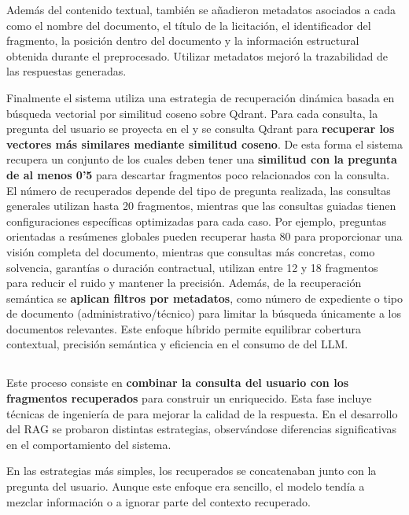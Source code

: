 Además del contenido textual, también se añadieron metadatos asociados a cada  como el nombre del documento, el título de la licitación, el identificador del fragmento, la posición dentro del documento y la información estructural obtenida durante el preprocesado. Utilizar metadatos mejoró la trazabilidad de las respuestas generadas.

Finalmente el sistema utiliza una estrategia de recuperación dinámica basada en búsqueda vectorial por similitud coseno sobre Qdrant. Para cada consulta, la pregunta del usuario se proyecta en el  y se consulta Qdrant para \textbf{recuperar los vectores más similares mediante similitud coseno}. De esta forma el sistema recupera un conjunto de  los cuales deben tener una \textbf{similitud con la pregunta de al menos 0'5} para descartar fragmentos poco relacionados con la consulta. El número de  recuperados depende del tipo de pregunta realizada, las consultas generales utilizan hasta 20 fragmentos, mientras que las consultas guiadas tienen configuraciones específicas optimizadas para cada caso. Por ejemplo, preguntas orientadas a resúmenes globales pueden recuperar hasta 80  para proporcionar una visión completa del documento, mientras que consultas más concretas, como solvencia, garantías o duración contractual, utilizan entre 12 y 18 fragmentos para reducir el ruido y mantener la precisión. Además, de la recuperación semántica se \textbf{aplican filtros por metadatos}, como número de expediente o tipo de documento (administrativo/técnico) para limitar la búsqueda únicamente a los documentos relevantes. Este enfoque híbrido permite equilibrar cobertura contextual, precisión semántica y eficiencia en el consumo de  del LLM.

\subsection{}

Este proceso consiste en \textbf{combinar la consulta del usuario con los fragmentos recuperados} para construir un  enriquecido. Esta fase incluye técnicas de ingeniería de  para mejorar la calidad de la respuesta. En el desarrollo del RAG se probaron distintas estrategias, observándose diferencias significativas en el comportamiento del sistema. 

En las estrategias más simples, los  recuperados se concatenaban junto con la pregunta del usuario. Aunque este enfoque era sencillo, el modelo tendía a mezclar información o a ignorar parte del contexto recuperado. 

